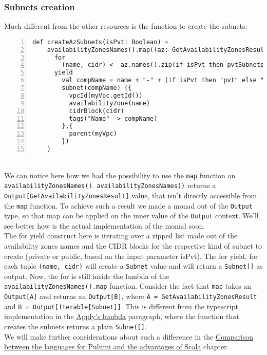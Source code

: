 \subsubsection{Subnets creation}
\label{sssec:subnets-creation}
Much different from the other resources is the function to create the subnets:
\begin{lstlisting}[numbers=left, numberstyle=\tiny, numbersep=-5pt, stepnumber=1,linewidth=420pt]
  def createAzSubnets(isPvt: Boolean) =
    availabilityZonesNames().map((az: GetAvailabilityZonesResult) =>
      for
        (name, cidr) <- az.names().zip(if isPvt then pvtSubnetsCidrs else pubSubnetsCidrs)
      yield
        val compName = name + "-" + (if isPvt then "pvt" else "pub") + "-subnet-scala"
        subnet(compName) ({
          vpcId(myVpc.getId())
          availabilityZone(name)
          cidrBlock(cidr)
          tags("Name" -> compName)
        },{
          parent(myVpc)
        })
    )
\end{lstlisting}\mbox{}\\
We can notice here how we had the possibility to use the \texttt{map} function on \texttt{availabilityZonesNames()}.
\texttt{availabilityZonesNames()} returns a \texttt{Output[GetAvailabilityZonesResult]} value, that isn't directly accessible from the \texttt{map} function.
To achieve such a result we made a monad out of the \texttt{Output} type, so that map can be applied on the inner value of the \texttt{Output} context.
We'll see better how is the actual implementation of the monad soon.\\
The for yield construct here is iterating over a zipped list made out of the availability zones names and the CIDR blocks for the respective kind of subnet to create (private or public, based on the input parameter isPvt).
The for yield, for each tuple \texttt{(name, cidr)} will create a \texttt{Subnet} value and will return a \texttt{Subnet[]} as output.
Now, the for is still inside the lambda of the \texttt{availabilityZonesNames().map} function.
Consider the fact that \texttt{map} takes an \texttt{Output[A]} and returns an \texttt{Output[B]}, where \texttt{A = GetAvailabilityZonesResult} and \texttt{B = Output[Iterable[Subnet]]}.
This is different from the typescript implementation in the \hyperref[par:ts-lambda]{Apply's lambda} paragraph, where the function that creates the subnets returns a plain \texttt{Subnet[]}.\\
We will make further considerations about such a difference in the \hyperref[cap:comparisons]{Comparison between the languages for Pulumi and the advantages of Scala} chapter.\\


